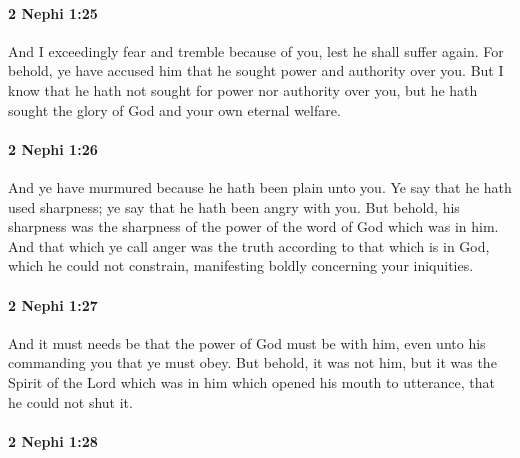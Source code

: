 		\paragraph{2 Nephi 1:25} %
			\label{2NEPHI-1-25}

			And I exceedingly fear and tremble because of you,
			lest he shall suffer again.
			For behold, ye have accused him
			that he sought power and authority over you.
			But I know that he hath not sought for power nor authority over you,
			but he hath sought the glory of God and your own eternal welfare.

		\paragraph{2 Nephi 1:26} %
			\label{2NEPHI-1-26}

			And ye have murmured because he hath been plain unto you.
			Ye say that he hath used sharpness;
			ye say that he hath been angry with you.
			But behold, his sharpness was the sharpness of the power
			of the word of God which was in him.
			And that which ye call anger was the truth
			according to that which is in God,
			which he could not constrain,
			manifesting boldly concerning your iniquities.

		\paragraph{2 Nephi 1:27} %
			\label{2NEPHI-1-27}

			And it must needs be that the power of God must be with him,
			even unto his commanding you that ye must obey.
			But behold, it was not him,
			but it was the Spirit of the Lord which was in him
			which opened his mouth to utterance, that he could not shut it.

		\paragraph{2 Nephi 1:28} %
			\label{2NEPHI-1-28}


